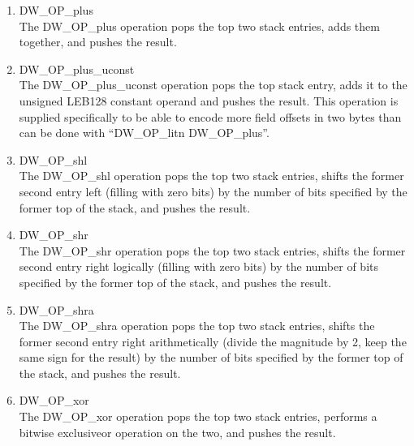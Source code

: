 \begin{enumerate}[1]
\label{chap:DWOPplus}
\item  DW\_OP\_plus \\
The DW\_OP\_plus operation pops the top two stack entries,
adds them together, and pushes the result.

\label{chap:DWOPplusuconst}
\item  DW\_OP\_plus\_uconst \\
The DW\_OP\_plus\_uconst operation pops the top stack entry,
adds it to the unsigned LEB128 constant operand and pushes
the result.  This operation is supplied specifically to be
able to encode more field offsets in two bytes than can be
done with “DW\_OP\_litn DW\_OP\_plus”.

\label{chap:DWOPshl}
\item DW\_OP\_shl \\
The DW\_OP\_shl operation pops the top two stack entries,
shifts the former second entry left (filling with zero bits)
by the number of bits specified by the former top of the stack,
and pushes the result.

\label{chap:DWOPshr}
\item DW\_OP\_shr \\
The DW\_OP\_shr operation pops the top two stack entries,
shifts the former second entry right logically (filling with
zero bits) by the number of bits specified by the former top
of the stack, and pushes the result.

\label{chap:DWOPshra}
\item DW\_OP\_shra \\
The DW\_OP\_shra operation pops the top two stack entries,
shifts the former second entry right arithmetically (divide
the magnitude by 2, keep the same sign for the result) by
the number of bits specified by the former top of the stack,
and pushes the result.

\label{chap:DWOPxor}
\item DW\_OP\_xor \\
The DW\_OP\_xor operation pops the top two stack entries,
performs a bitwise exclusive\dash or operation on the two, and
pushes the result.

\end{enumerate}

